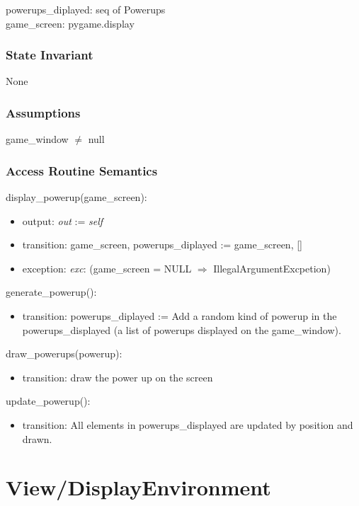 \documentclass[12pt]{article}
\begin{document}
powerups\_diplayed: seq of Powerups\\ 
game\_screen: pygame.display \\

\subsubsection* {State Invariant}

None

\subsubsection* {Assumptions}

game\_window $\neq$ null

\subsubsection* {Access Routine Semantics}

display\_powerup(game\_screen):
\begin{itemize}
    \item output: \textit{out} := \textit{self}
    \item transition: game\_screen, powerups\_diplayed := game\_screen, []
    \item exception: \textit{exc}: (game\_screen = NULL $\Rightarrow$ IllegalArgumentExcpetion)
\end{itemize}
\noindent generate\_powerup():
\begin{itemize}
    \item transition: powerups\_diplayed := Add a random kind of powerup in the powerups\_displayed (a list of powerups displayed on the game\_window). 
\end{itemize}
\noindent draw\_powerups(powerup): 
\begin{itemize}
    \item transition: draw the power up on the screen
\end{itemize}

\noindent update\_powerup():
\begin{itemize}
    \item transition: All elements in powerups\_displayed are updated by position and drawn. 
\end{itemize}


\newpage
\section*{View/DisplayEnvironment}
\end{document}
